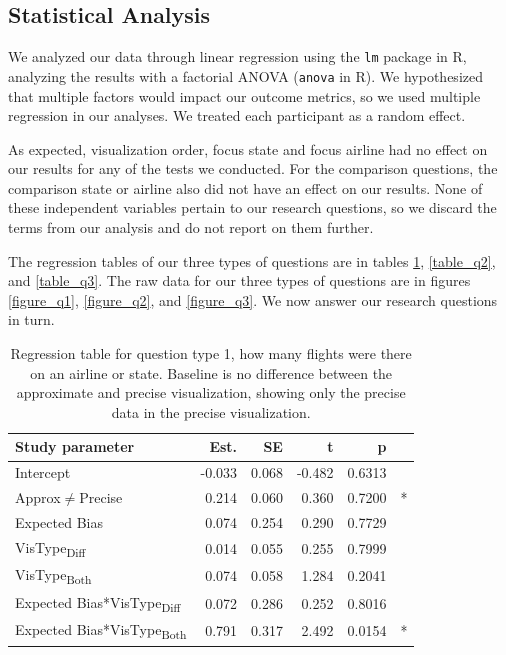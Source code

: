 \documentclass[10pt,journal,compsoc]{IEEEtran}
\begin{document}
\subsection{Statistical Analysis}

We analyzed our data through linear regression using the \texttt{lm} package in R, analyzing the results with a factorial ANOVA (\texttt{anova} in R).
We hypothesized that multiple factors would impact our outcome metrics, so we used multiple regression in our analyses.
We treated each participant as a random effect.

As expected, visualization order, focus state and focus airline had no effect on our results for any of the tests we conducted.
For the comparison questions, the comparison state or airline also did not have an effect on our results.
None of these independent variables pertain to our research questions, so we discard the terms from our analysis and do not report on them further.

The regression tables of our three types of questions are in tables \ref{table_q1}, \ref{table_q2}, and \ref{table_q3}.
The raw data for our three types of questions are in figures \ref{figure_q1}, \ref{figure_q2}, and \ref{figure_q3}.
We now answer our research questions in turn.

\begin{table}[!t]
\renewcommand{\arraystretch}{1.3}
\caption{Regression table for question type 1, how many flights were there on an airline or state. Baseline is no difference between the approximate and precise visualization, showing only the precise data in the precise visualization.}
\label{table_q1}
\centering
\begin{tabular}{|l||r|r|r|r@{}l|}
\hline
Study parameter & Est. & SE & t & p & \\
\hline
\hline
Intercept & -0.033 & 0.068 & -0.482 & 0.6313 &  \\
\hline
Approx$\neq$Precise & 0.214 & 0.060 & 0.360 & 0.7200 & * \\
\hline
Expected Bias & 0.074 & 0.254 & 0.290 & 0.7729 &  \\
\hline
VisType\textsubscript{Diff} & 0.014 & 0.055 & 0.255 & 0.7999 &  \\
\hline
VisType\textsubscript{Both} & 0.074 & 0.058 & 1.284 & 0.2041 &  \\
\hline
Expected Bias*VisType\textsubscript{Diff} & 0.072 & 0.286 & 0.252 & 0.8016 &  \\
\hline
Expected Bias*VisType\textsubscript{Both} & 0.791 & 0.317 & 2.492 & 0.0154 & * \\
\hline
\end{tabular}
\end{table}
\end{document}
